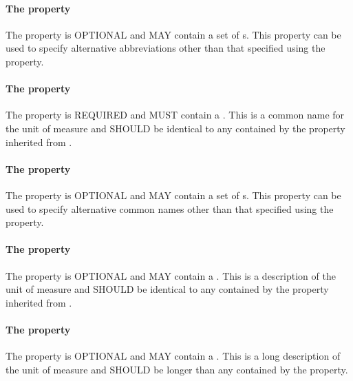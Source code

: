 \paragraph{The  property}\label{sec:alternativeSymbols:Unit}
The  property is OPTIONAL and MAY contain a set of s. This property can be used to specify alternative abbreviations other than that specified using the  property.

\paragraph{The  property}\label{sec:label:Unit}
The  property is REQUIRED and MUST contain a . This  is a common name for the unit of measure and SHOULD be identical to any  contained by the  property inherited from .

\paragraph{The  property}\label{sec:alternativeLabels:Unit}
The  property is OPTIONAL and MAY contain a set of s. This property can be used to specify alternative common names other than that specified using the  property.

\paragraph{The  property}\label{sec:comment:Unit}
The  property is OPTIONAL and MAY contain a . This  is a description of the unit of measure and SHOULD be identical to any  contained by the  property inherited from .

\paragraph{The  property}\label{sec:longcomment:Unit}
The  property is OPTIONAL and MAY contain a . This  is a long description of the unit of measure and SHOULD be longer than any  contained by the  property.


